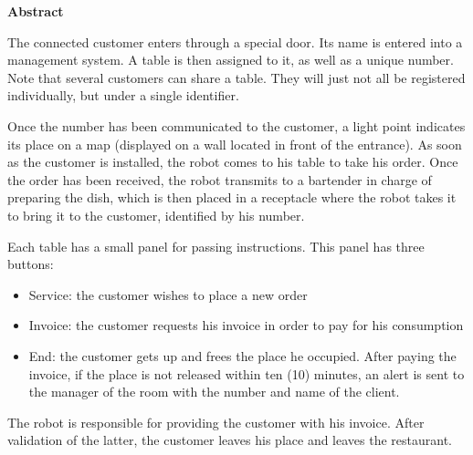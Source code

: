 \textbf{Abstract}
\par
The connected customer enters through a special door. 
Its name is entered into a management system. A table 
is then assigned to it, as well as a unique number. 
Note that several customers can share a table. They 
will just not all be registered individually, but 
under a single identifier. \par 
Once the number has been communicated to the customer, 
a light point indicates its place on a map (displayed 
on a wall located in front of the entrance). As soon 
as the customer is installed, the robot comes to his 
table to take his order. Once the order has been 
received, the robot transmits to a bartender in charge 
of preparing the dish, which is then placed in a 
receptacle where the robot takes it to bring it to 
the customer, identified by his number. \par 
Each table has a small panel for passing instructions. 
This panel has three buttons:
\par 
\begin{itemize}
    \item Service: the customer wishes to place a new order
    \item Invoice: the customer requests his invoice in order to pay for his consumption
    \item End: the customer gets up and frees the place 
    he occupied. After paying the invoice, if the 
    place is not released within ten (10) minutes, 
    an alert is sent to the manager of the room with 
    the number and name of the client.
\end{itemize}
\par 
The robot is responsible for providing the customer with his 
invoice. After validation of the latter, the customer 
leaves his place and leaves the restaurant.
\par 